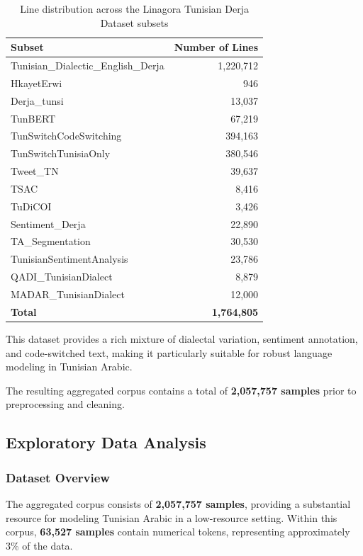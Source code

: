 \documentclass[12pt,a4paper]{report}
\begin{document}
\begin{table}[h]
\centering
\caption{Line distribution across the Linagora Tunisian Derja Dataset subsets}
\label{tab:derja_distribution}
\begin{tabular}{l r}
\hline
\textbf{Subset} & \textbf{Number of Lines} \\
\hline
Tunisian\_Dialectic\_English\_Derja & 1{,}220{,}712 \\
HkayetErwi & 946 \\
Derja\_tunsi & 13{,}037 \\
TunBERT & 67{,}219 \\
TunSwitchCodeSwitching & 394{,}163 \\
TunSwitchTunisiaOnly & 380{,}546 \\
Tweet\_TN & 39{,}637 \\
TSAC & 8{,}416 \\
TuDiCOI & 3{,}426 \\
Sentiment\_Derja & 22{,}890 \\
TA\_Segmentation & 30{,}530 \\
TunisianSentimentAnalysis & 23{,}786 \\
QADI\_TunisianDialect & 8{,}879 \\
MADAR\_TunisianDialect & 12{,}000 \\
\hline
\textbf{Total} & \textbf{1{,}764{,}805 } \\
\end{tabular}
\end{table}
\noindent This dataset provides a rich mixture of dialectal variation, sentiment
annotation, and code-switched text, making it particularly suitable for robust
language modeling in Tunisian Arabic.

\noindent The resulting aggregated corpus contains a total of
\textbf{2,057,757 samples} prior to preprocessing and cleaning.
\subsection{Exploratory Data Analysis}

\subsubsection{Dataset Overview}

The aggregated corpus consists of \textbf{2,057,757 samples}, providing a substantial resource for modeling Tunisian Arabic in a low-resource setting. Within this corpus, \textbf{63,527 samples} contain numerical tokens, representing approximately 3\% of the data.
\end{document}
